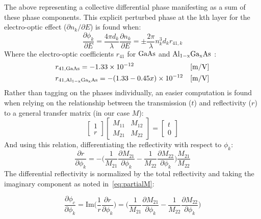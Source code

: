 \noindent The above representing a collective differential phase manifesting as a sum of these phase components. This explicit perturbed phase at the kth layer for the electro-optic effect ($\partial n_k/\partial E$) is found when:
\begin{equation}\label{eq:EOphasekdiff}
	\frac{\partial \phi_k}{\partial E} = \frac{4 \pi d_k}{\lambda} \frac{\partial n_k}{\partial E} = \pm \frac{ 2 \pi}{\lambda} n_k^3 d_k r_{41,k}
\end{equation}
\noindent Where the electro-optic coefficients $r_{41}$ for $\mathrm{GaAs}$ and $\mathrm{Al_{1-x}Ga_{x}As}$ \cite{suzuki:1984, adachi:semiconductors, adachi:algaas}:
\begin{equation}
\begin{aligned}
	& r_{41, \mathrm{GaAs}} =  -1.33 \times 10^{-12} & [\mathrm{m} / \mathrm{V}]
	\\ 
	& r_{41, \mathrm{Al_{1-x}Ga_{x}As}}  = - (1.33 - 0.45x) \times 10^{-12} &  [\mathrm{m}/\mathrm{V}]
\end{aligned}
\end{equation}
\noindent Rather than tagging on the phases individually, an easier computation is found when relying on the relationship between the transmission ($t$) and reflectivity ($r$) to a general transfer matrix (in our case $M$):
$$
	\begin{bmatrix} 1 \\ r \end{bmatrix} \begin{bmatrix} M_{11} & M_{12} \\ M_{21} & M_{22} \end{bmatrix} = \begin{bmatrix} t \\ 0\end{bmatrix}
$$
\noindent And using this relation, differentiating the reflectivity with respect to $\phi_k$:
$$
	\frac{\partial r}{\partial \phi_k} = - \bigg( \frac{1}{M_{21}} \frac{\partial M_{21}}{\partial \phi_k} - \frac{1}{M_{22}}\frac{\partial M_{22}}{\partial \phi_k} \bigg) \frac{M_{21}}{M_{22}}
$$
\noindent The differential reflectivity is normalized by the total reflectivity and taking the imaginary component as noted in~\eqref{eq:partialM}: 

\begin{equation}
	\frac{\partial \phi_c}{\partial \phi_k}  = \mathrm{Im} \bigg(\frac{1}{r} \frac{\partial r}{\partial \phi_k} \bigg) =  \bigg( \frac{1}{M_{21}} \frac{\partial M_{21}}{\partial \phi_k} - \frac{1}{M_{22}}\frac{\partial M_{22}}{\partial \phi_k} \bigg) 
\end{equation}

